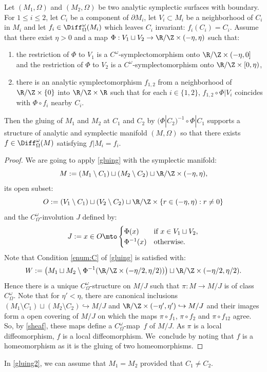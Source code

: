 \label{S23}
\begin{theorem}\label{gluing2}
Let $(M_1,\Omega)$ and $(M_2,\Omega)$ be two analytic symplectic surfaces with boundary. For $1\le i\le 2$, let
$C_i$ be a component of $\partial M_i$, let $V_i\subset M_i$ be a neighborhood of $C_i$ in $M_i$
and let $f_i\in \Diff^\omega_\Omega(M_i)$ which leaves $C_i$ invariant: $f_i(C_i) = C_i$.
Assume that there exist $\eta>0$ and a map $\Phi: V_1\sqcup V_2\to \R/\Z\times (-\eta,\eta)$ such that:
\begin{enumerate}
\item the restriction of $\Phi$ to $V_1$ is a $C^\omega$-symplectomorphism onto
$\R/\Z\times (-\eta, 0]$ and the restriction of $\Phi$ to $V_2$ is a $C^\omega$-symplectomorphism onto $\R/\Z\times [0, \eta)$,
\item there is an analytic symplectomorphism $f_{1,2}$ from a neighborhood of $\R/\Z\times \{0\}$ into $\R/\Z\times \R$ such that for each $i\in \{1,2\}$, $f_{1,2}\circ \Phi|V_i$ coincides with $ \Phi\circ f_i $ nearby $C_i$.
\end{enumerate}
Then the gluing of $M_1$ and $M_2$ at $C_1$ and $C_2$ by $(\Phi|C_2)^{-1}\circ \Phi|C_1$ supports a structure of analytic and symplectic manifold $(M,\Omega)$ so that there exists $f\in \Diff^\omega_\Omega(M)$ satisfying $f|M_i=f_i$.
\end{theorem}
\begin{proof} We are going to apply \cref{gluing} with the symplectic manifold:
\[M:= (M_1\setminus C_1)\sqcup (M_2\setminus C_2)\sqcup \R/\Z\times(-\eta, \eta),\]
its open subset:
\[O:= (V_1\setminus C_1)\sqcup (V_2\setminus C_2)\sqcup \R/\Z\times \{r\in (-\eta, \eta): r\neq 0\} \]
and the $C^\omega_\Omega$-involution $J$ defined by:
\[J:= x\in O\mto
\begin{cases}
\Phi(x) & \text{if } x\in V_1\sqcup V_2,\\
\Phi^{-1}(x) & \text{otherwise}.\\
\end{cases}
\]
Note that Condition \eqref{enum:C} of \cref{gluing} is satisfied with:
\[W:=
\left(M_1\sqcup M_2\setminus \Phi^{-1}(\R/\Z\times (-\eta/2,\eta/2))\right)\sqcup
\R/\Z\times (-\eta/2,\eta/2).\]
Hence there is a unique $C^\omega_\Omega$-structure on $ M/J$ such that $\pi: M\to M/J$ is of class $C^\omega_\Omega$.
Note that for $\eta'<\eta$, there are canonical inclusions
$(M_1\setminus C_1)\sqcup (M_2\setminus C_2)\hookrightarrow M/J$ and $\R/\Z\times (-\eta', \eta')\hookrightarrow M/J$ and their images form a open covering of $M/J$ on which the maps $\pi\circ f_1$, $\pi\circ f_2$ and $\pi\circ f_{12}$ agree. So, by \cref{sheaf}, these maps define a $C^\omega_\Omega$\nobreakdash-map~$f$ of $M/J$. As $\pi$ is a local diffeomorphism, $f$ is a local diffeomorphism. We~conclude by noting that $f$ is a homeomorphism as it is the gluing of two homeomorphisms.
\end{proof}
\begin{remark} In \cref{gluing2}, we can assume that $M_1=M_2$ provided that $C_1\neq C_2$.
\end{remark}
